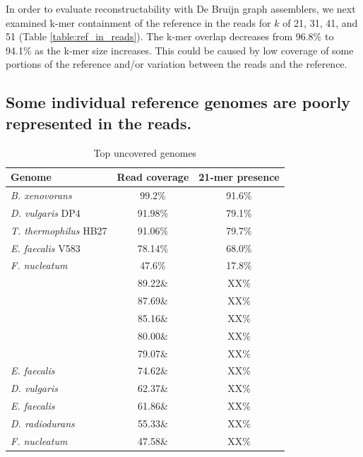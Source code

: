 \documentclass[10pt,a4paper,twocolumn]{article}
\begin{document}
In order to evaluate reconstructability with De Bruijn graph
assemblers, we next examined k-mer containment of the reference in the
reads for $k$ of 21, 31, 41, and 51 (Table \ref{table:ref_in_reads}).
The k-mer overlap decreases from 96.8\% to 94.1\% as the k-mer size
increases. This could be caused by low coverage of some portions
of the reference and/or variation between the reads and the reference.



\subsection*{Some individual reference genomes are poorly represented in the reads.}


\begin{table}[!h]
\centering
\caption{Top uncovered genomes}
\begin{tabular}{|l|c|c|}\hline
\textbf{Genome} & \textbf {Read coverage} & \textbf{21-mer presence} \\ \hline 
{{\em B. xenovorans}} & 99.2\% & 91.6\% \\
\hline
{{\em D. vulgaris} DP4}  & 91.98\% & 79.1\% \\
\hline
{{\em T. thermophilus} HB27}  & 91.06\% & 79.7\% \\
\hline
{{\em E. faecalis} V583}  & 78.14\% & 68.0\% \\
\hline
{{\em F. nucleatum}}  & 47.6\% & 17.8\% \\

{{\em }} & 89.22\& & XX\% \\
{{\em }} & 87.69\& & XX\% \\
{{\em }} & 85.16\& & XX\% \\
{{\em }} & 80.00\& & XX\% \\
{{\em }} & 79.07\& & XX\% \\
{{\em E. faecalis}} & 74.62\& & XX\% \\
{{\em D. vulgaris}} & 62.37\& & XX\% \\
{{\em E. faecalis}} & 61.86\& & XX\% \\
{{\em D. radiodurans}} & 55.33\& & XX\% \\
{{\em F. nucleatum }} & 47.58\& & XX\% \\


\hline
\end{tabular}
\label{table:genomes_uncovered-analysis}
\end{table}
\end{document}
